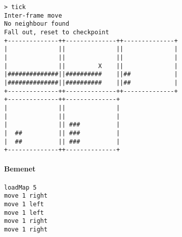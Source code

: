 \begin{verbatim}
> tick
Inter-frame move
No neighbour found
Fall out, reset to checkpoint
+--------------++--------------++--------------+
|              ||              ||              |
|              ||              ||              |
|              ||         X    ||              |
|##############||##########    ||##            |
|##############||##########    ||##            |
+--------------++--------------++--------------+
+--------------++--------------+                
|              ||              |                
|              ||              |                
|              || ###          |                
|  ##          || ###          |                
|  ##          || ###          |                
+--------------++--------------+                
\end{verbatim}
		        
		        \paragraph*{Bemenet}
\begin{verbatim}
loadMap 5
move 1 right
move 1 left
move 1 left
move 1 right
move 1 right
\end{verbatim}

